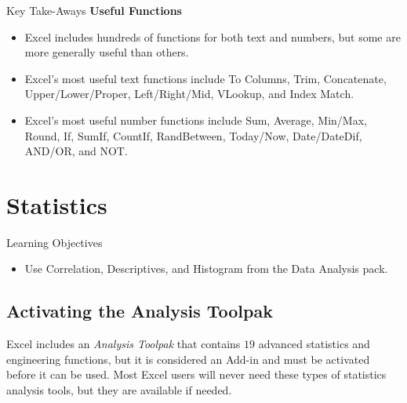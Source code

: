 \begin{enumbox}
\begin{enumerate}
	\end{enumerate}
\end{enumbox}
	
\begin{center}
	\begin{tkwbox}{Key Take-Aways}
		\textbf{Useful Functions}
		\\
		\begin{itemize}
			\setlength{\itemsep}{0pt}
			\setlength{\parskip}{0pt}
			\setlength{\parsep}{0pt}
			
			\item Excel includes hundreds of functions for both text and numbers, but some are more generally useful than others.  
			\item Excel's most useful text functions include To Columns, Trim, Concatenate, Upper/Lower/Proper, Left/Right/Mid, VLookup, and Index Match.
			\item Excel's most useful number functions include Sum, Average, Min/Max, Round, If, SumIf, CountIf, RandBetween, Today/Now, Date/DateDif, AND/OR, and NOT.
			
		\end{itemize}
	\end{tkwbox}
\end{center}

\section{Statistics}

\begin{center}
	\begin{objbox}{Learning Objectives}
		\begin{itemize}
			\setlength{\itemsep}{0pt}
			\setlength{\parskip}{0pt}
			\setlength{\parsep}{0pt}
			
			\item Use Correlation, Descriptives, and Histogram from the Data Analysis pack.
			
		\end{itemize}
	\end{objbox}
\end{center}

\subsection{Activating the Analysis Toolpak}

Excel includes an \textit{Analysis Toolpak} that contains $ 19 $ advanced statistics and engineering functions, but it is considered an Add-in and must be activated before it can be used. Most Excel users will never need these types of statistics analysis tools, but they are available if needed.

